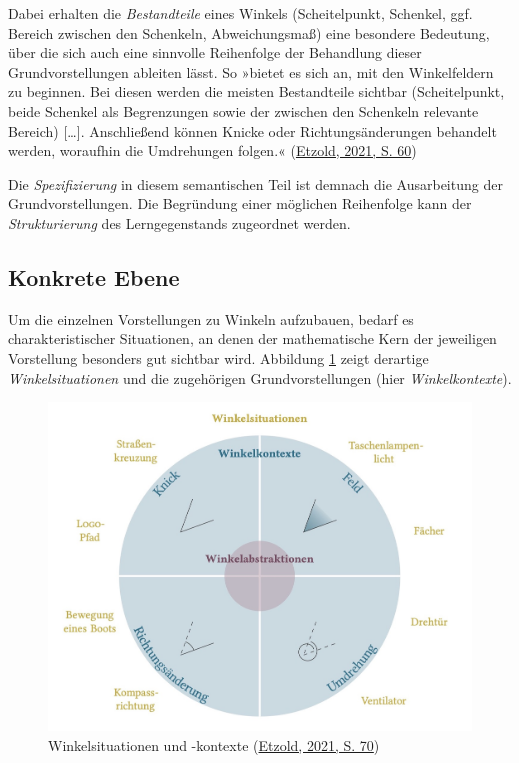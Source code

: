 \documentclass[
]{scrbook}
\theoremstyle{definition}
\theoremstyle{definition}
\theoremstyle{definition}
\theoremstyle{definition}
\theoremstyle{remark}
\begin{document}
Dabei erhalten die \emph{Bestandteile} eines Winkels (Scheitelpunkt, Schenkel, ggf. Bereich zwischen den Schenkeln, Abweichungsmaß) eine besondere Bedeutung, über die sich auch eine sinnvolle Reihenfolge der Behandlung dieser Grundvorstellungen ableiten lässt. So »bietet es sich an, mit den Winkelfeldern zu beginnen. Bei diesen werden die meisten Bestandteile sichtbar (Scheitelpunkt, beide Schenkel als Begrenzungen sowie der zwischen den Schenkeln relevante Bereich) {[}\ldots{]}. Anschließend können Knicke oder Richtungsänderungen behandelt werden, woraufhin die Umdrehungen folgen.« (\protect\hyperlink{ref-Etzold2021}{Etzold, 2021, S. 60})

Die \emph{Spezifizierung} in diesem semantischen Teil ist demnach die Ausarbeitung der Grundvorstellungen. Die Begründung einer möglichen Reihenfolge kann der \emph{Strukturierung} des Lerngegenstands zugeordnet werden.

\hypertarget{konkrete-ebene}{%
\subsection{Konkrete Ebene}\label{konkrete-ebene}}

Um die einzelnen Vorstellungen zu Winkeln aufzubauen, bedarf es charakteristischer Situationen, an denen der mathematische Kern der jeweiligen Vorstellung besonders gut sichtbar wird. Abbildung \ref{fig:Winkelsituationen} zeigt derartige \emph{Winkelsituationen} und die zugehörigen Grundvorstellungen (hier \emph{Winkelkontexte}).



\begin{figure}

{\centering \includegraphics[width=0.75\linewidth]{pictures/1-Winkelsituationen} 

}

\caption{Winkelsituationen und -kontexte (\protect\hyperlink{ref-Etzold2021}{Etzold, 2021, S. 70})}\label{fig:Winkelsituationen}
\end{figure}
\end{document}
